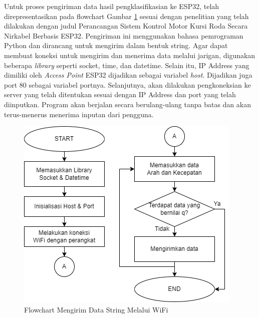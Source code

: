 Untuk proses pengiriman data hasil pengklasifikasian ke ESP32, telah direpresentasikan pada flowchart Gambar \ref{fig:Flowchart Mengirim Data String Melalui WiFi} sesuai dengan penelitian yang telah dilakukan \parencite{ekatama2024perancangan} dengan judul Perancangan Sistem Kontrol Motor Kursi Roda Secara Nirkabel Berbasis ESP32. Pengiriman ini menggunakan bahasa pemrograman Python dan dirancang untuk mengirim dalam bentuk string. Agar dapat membuat koneksi untuk mengirim dan menerima data melalui jarigan, digunakan beberapa \emph{library} seperti socket, time, dan datetime. Selain itu, IP Address yang dimiliki oleh \emph{Access Point} ESP32 dijadikan sebagai variabel \emph{host}. Dijadikan juga port 80 sebagai variabel portnya. Selanjutnya, akan dilakukan pengkoneksian ke server yang telah ditentukan sesuai dengan IP Address dan port yang telah diinputkan. Program akan berjalan secara berulang-ulang tanpa batas dan akan terus-menerus menerima inputan dari pengguna.

\begin{figure}[H]
  \centering
  \includegraphics[scale=0.8]{gambar/10. Mengirim Data String WiFi.png}
  \caption{Flowchart Mengirim Data String Melalui WiFi \parencite{ekatama2024perancangan}}
  \label{fig:Flowchart Mengirim Data String Melalui WiFi}
\end{figure}


